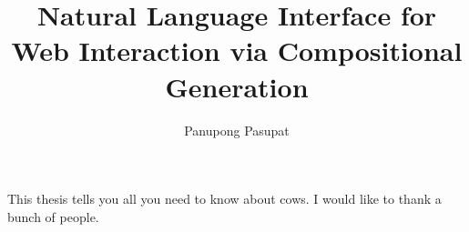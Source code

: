 \documentclass{report}
\begin{document}
\title{Natural Language Interface for Web Interaction via Compositional Generation}
\author{Panupong Pasupat}
 
\beforepreface
{}
This thesis tells you all you need to know about cows.
I would like to thank a bunch of people.
\afterpreface



\appendix



\end{document}
